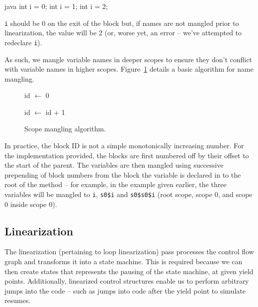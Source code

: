 \documentclass[journal,a4paper]{IEEEtran}
\begin{document}
\begin{pygmented}{java}
int i = 0;
{
    int i = 1;
    {
        int i = 2;
    }
}
\end{pygmented}

\texttt{i} should be 0 on the exit of the block but, if names are not mangled prior to
linearization, the value will be 2 (or, worse yet, an error -- we've attempted to redeclare
\texttt{i}).

As such, we mangle variable names in deeper scopes to ensure they don't conflict with variable
names in higher scopes. Figure~\ref{algorithm:scope-mangling} details a basic algorithm for name
mangling.

\begin{figure}
\begin{algorithmic}
    \State id $\gets$ 0
            \State {}
        \EndFor

                \State {}
            \EndFor
        \EndFor
        \State id $\gets$ id + 1
    \EndFor
\EndFunction
\end{algorithmic}
\caption{Scope mangling algorithm.}
\label{algorithm:scope-mangling}
\end{figure}

In practice, the block ID is not a simple monotonically increasing number. For the implementation
provided, the blocks are first numbered off by their offset to the start of the parent. The
variables are then mangled using successive prepending of block numbers from the block the variable
is declared in to the root of the method -- for example, in the example given earlier, the three
variables will be mangled to \texttt{i}, \texttt{s0\$i} and \texttt{s0\$s0\$i} (root scope, scope
0, and scope 0 inside scope 0).

\subsection{Linearization} \label{section:linearization}

The linearization (pertaining to loop linearization) pass processes the control flow graph and
transforms it into a state machine. This is required because we can then create states that
represents the pausing of the state machine, at given yield points. Additionally, linearized
control structures enable us to perform arbitrary jumps into the code -- such as jumps into code
after the yield point to simulate resumes.
\end{document}
